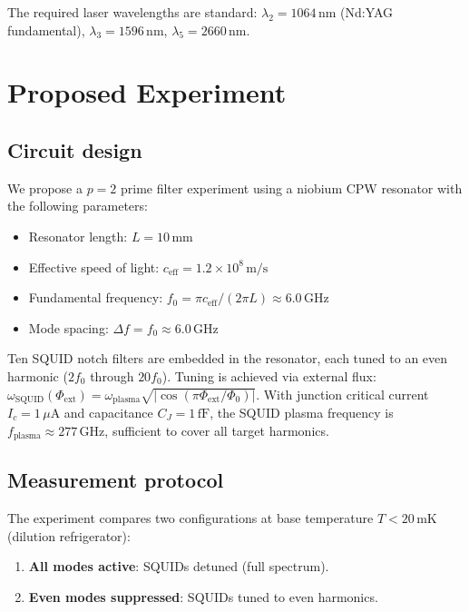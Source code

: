 \documentclass[aps,prd,twocolumn,superscriptaddress,nofootinbib]{revtex4-2}
\begin{document}
The required laser wavelengths are standard:
$\lambda_2 = 1064\,\mathrm{nm}$ (Nd:YAG fundamental),
$\lambda_3 = 1596\,\mathrm{nm}$, $\lambda_5 = 2660\,\mathrm{nm}$.

\section{Proposed Experiment}
\label{sec:experiment}

\subsection{Circuit design}

We propose a $p = 2$ prime filter experiment using a niobium
CPW resonator with the following parameters:
\begin{itemize}
  \item Resonator length: $L = 10\,\mathrm{mm}$
  \item Effective speed of light: $c_{\mathrm{eff}} = 1.2 \times 10^8\,\mathrm{m/s}$
  \item Fundamental frequency: $f_0 = \pi c_{\mathrm{eff}}/(2\pi L) \approx 6.0\,\mathrm{GHz}$
  \item Mode spacing: $\Delta f = f_0 \approx 6.0\,\mathrm{GHz}$
\end{itemize}

Ten SQUID notch filters are embedded in the resonator,
each tuned to an even harmonic ($2f_0$ through $20f_0$).
Tuning is achieved via external flux:
$\omega_{\mathrm{SQUID}}(\Phi_{\mathrm{ext}}) = \omega_{\mathrm{plasma}}
\sqrt{|\cos(\pi\Phi_{\mathrm{ext}}/\Phi_0)|}$.
With junction critical current $I_c = 1\,\mu\mathrm{A}$
and capacitance $C_J = 1\,\mathrm{fF}$, the SQUID plasma
frequency is $f_{\mathrm{plasma}} \approx 277\,\mathrm{GHz}$,
sufficient to cover all target harmonics.

\subsection{Measurement protocol}

The experiment compares two configurations at base temperature
$T < 20\,\mathrm{mK}$ (dilution refrigerator):
\begin{enumerate}
  \item[A.] \textbf{All modes active}: SQUIDs detuned (full spectrum).
  \item[B.] \textbf{Even modes suppressed}: SQUIDs tuned to even harmonics.
\end{enumerate}
\end{document}
